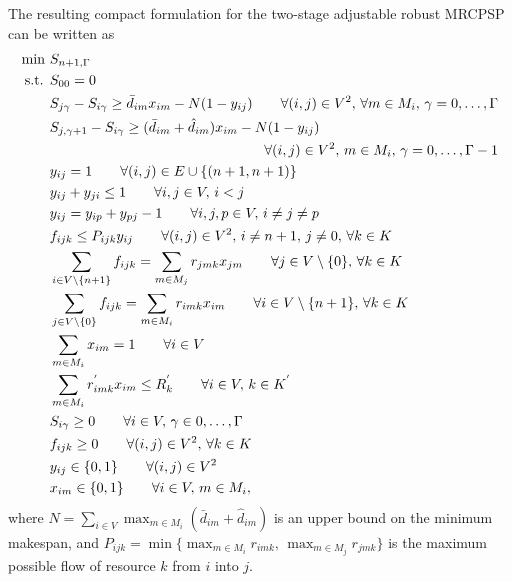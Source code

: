 \documentclass[a4paper,abstracton]{scrartcl}
\begin{document}
The resulting compact formulation for the two-stage adjustable robust MRCPSP can be written as
\begin{align}
\min \ & S_{n+1,\Gamma}\label{eqn:compact1}\\
\text{s.t. } & S_{00}=0\label{eqn:compact2}\\
	     & S_{j\gamma} - S_{i\gamma} \geq \bar{d}_{im}x_{im} - N(1-y_{ij}) \qquad \forall (i,j)\in V^2,\,\forall m\in M_i,\,\gamma=0,\dots,\Gamma\label{eqn:compact_bigM1}\\
	     & S_{j,\gamma+1} - S_{i\gamma} \geq (\bar{d}_{im} + \hat{d}_{im})x_{im} - N(1-y_{ij})\nonumber \\
	     & & \hspace{-8cm} \forall (i,j)\in V^2,\, m\in M_i,\,\gamma = 0,\dots,\Gamma-1\label{eqn:compact_bigM2}\\
	     & y_{ij}=1 \qquad \forall (i,j) \in E\cup\{(n+1,n+1)\}\label{eqn:compact5}\\
	     & y_{ij} + y_{ji} \leq 1 \qquad \forall i,j\in V,\, i<j\label{eqn:compact_trans1}\\
	     & y_{ij} = y_{ip} + y_{p j} - 1 \qquad \forall i,j,p\in V,\,i\neq j\neq p\label{eqn:compact_trans2}\\
	     & f_{ijk}\leq P_{ijk}y_{ij} \qquad \forall (i,j)\in V^2,\,i\neq n+1,\,j\neq0,\, \forall k \in K\label{eqn:compact6}\\
	     & \sum_{i\in V\setminus\{n+1\}}f_{ijk}=\sum_{m\in M_j}r_{jmk}x_{jm} \qquad \forall j \in V\setminus\{0\} ,\, \forall k\in K\label{eqn:compact7}\\
	     & \sum_{j\in V\setminus\{0\}}f_{ijk}=\sum_{m\in M_i}r_{imk}x_{im} \qquad \forall i \in V\setminus\{n+1\},\,\forall k\in K\label{eqn:compact8}\\
	     & \sum_{m\in M_i}x_{im} = 1 \qquad \forall i\in V\label{eqn:compact9}\\
	     & \sum_{m\in M_i}r^{'}_{imk}x_{im} \leq R^{'}_k \qquad \forall i \in V,\,k\in K^{'}\label{eqn:compact_nonrenewable}\\
	     & S_{i\gamma}\geq 0 \qquad \forall i\in V,\,\gamma \in 0,\dots, \Gamma\label{eqn:compact10}\\
	     & f_{ijk}\geq 0 \qquad \forall (i,j)\in V^2 ,\, \forall k \in K\label{eqn:compact11}\\
	     & y_{ij}\in\{0,1\} \qquad \forall (i,j)\in V^2\label{eqn:compact12}\\
	     & x_{im}\in\{0,1\} \qquad \forall i\in V,\,m\in M_i\label{eqn:compact13},
\end{align}
where $N=\sum_{i\in V}\max_{m\in M_i}(\bar{d}_{im}+\hat{d}_{im})$ is an upper bound on the minimum makespan, and $P_{ijk}=\min\{\max_{m\in M_i}r_{imk},\,\max_{m\in M_j} r_{jmk}\}$ is the maximum possible flow of resource $k$ from $i$ into $j$.
\end{document}
